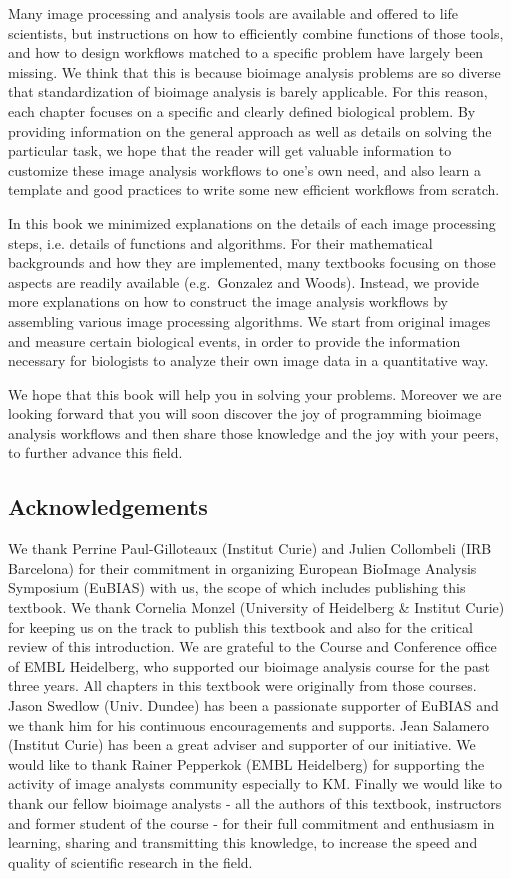 Many image processing and analysis tools are available and offered to
life scientists, but instructions on how to efficiently combine functions of those tools, 
and how to design workflows matched to a specific problem have largely been missing. 
We think that this is because bioimage analysis problems are so diverse that
standardization of bioimage analysis is barely applicable. For this
reason, each chapter focuses on a specific and clearly defined biological
problem. By providing information on the general approach as well as details on solving the particular task, we hope that the reader will get valuable information to customize these image analysis workflows to one's own need, and also learn a template and good practices to  write some new efficient workflows from scratch.

In this book we minimized explanations on the details of each
image processing steps, i.e. details of functions and algorithms. For their mathematical backgrounds and how they
are implemented, many textbooks focusing on those aspects are readily available (e.g.~Gonzalez and Woods). Instead, we provide more explanations on how to construct the image analysis workflows by
assembling various image processing algorithms. We start from original
images and measure certain biological events, in order to provide the 
information necessary for biologists to analyze their own image data in a quantitative way.

We hope that this book will help you in solving your problems. Moreover we are looking forward that you will soon discover the joy of programming bioimage analysis workflows and then share those knowledge and the joy with your peers, to further advance this field.

\subsection{Acknowledgements}\label{acknowledgements}

We thank Perrine Paul-Gilloteaux (Institut Curie) and Julien Collombeli (IRB Barcelona) for their commitment in organizing European BioImage Analysis Symposium (EuBIAS) with us, the scope of which includes publishing this textbook. We thank Cornelia Monzel (University of Heidelberg \& Institut Curie) for keeping us on the track to publish this textbook and also for the critical review of this introduction. We are grateful to the Course and Conference office of EMBL Heidelberg, who supported our bioimage analysis course for the past three years. All chapters in this textbook were originally from those courses. Jason Swedlow (Univ. Dundee) has been a passionate supporter of EuBIAS and we thank him for his continuous encouragements and supports. Jean Salamero (Institut Curie) has been a great adviser and supporter of our initiative. We would like to thank Rainer Pepperkok (EMBL Heidelberg) for supporting the activity of image analysts community especially to KM.  Finally we would like to thank our fellow bioimage analysts - all the authors of this textbook, instructors and former student of the course - for their full commitment and enthusiasm in learning, sharing and  transmitting this knowledge, to increase the speed and quality of scientific research in the field.